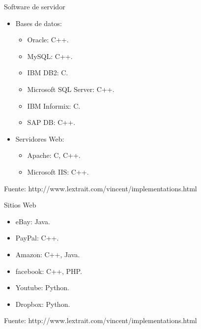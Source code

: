 \begin{frame}[t]{Software de servidor}
  \begin{itemize}
    \item Bases de datos:
      \begin{itemize}
        \item Oracle: C++.
        \item MySQL: C++.
        \item IBM DB2: C.
        \item Microsoft SQL Server: C++.
        \item IBM Informix: C.
        \item SAP DB: C++.
      \end{itemize}
    \item Servidores Web:
      \begin{itemize}
        \item Apache: C, C++.
        \item Microsoft IIS: C++.
      \end{itemize}
  \end{itemize}
  \vfill
  {\tiny Fuente: http://www.lextrait.com/vincent/implementations.html}
\end{frame}

\begin{frame}[t]{Sitios Web}
  \begin{itemize}
    \item eBay: Java.
    \item PayPal: C++.
    \item Amazon: C++, Java.
    \item facebook: C++, PHP.
    \item Youtube: Python.
    \item Dropbox: Python.
  \end{itemize}
  \vfill
  {\tiny Fuente: http://www.lextrait.com/vincent/implementations.html}
\end{frame}

